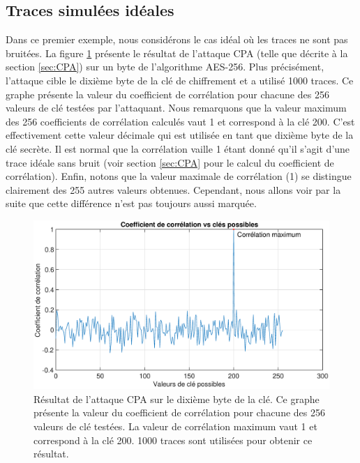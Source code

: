 \documentclass[oneside]{book}
\begin{document}
\subsection{Traces simulées idéales}
\label{sec:sim_trace}

Dans ce premier exemple, nous considérons le cas idéal où les traces ne sont pas bruitées. La figure \ref{fig:sim_10000_traces} présente le résultat de l'attaque CPA (telle que décrite à la section \ref{sec:CPA}) sur un byte de l'algorithme AES-256. Plus précisément, l'attaque cible le dixième byte de la clé de chiffrement et a utilisé 1000 traces. Ce graphe présente la valeur du coefficient de corrélation pour chacune des 256 valeurs de clé testées par l'attaquant. Nous remarquons que la valeur maximum des 256 coefficients de corrélation calculés vaut 1 et correspond à la clé 200. C'est effectivement cette valeur décimale qui est utilisée en tant que dixième byte de la clé secrète. Il est normal que la corrélation vaille 1 étant donné qu'il s'agit d'une trace idéale sans bruit (voir section \ref{sec:CPA} pour le calcul du coefficient de corrélation). Enfin, notons que la valeur maximale de corrélation (1) se distingue clairement des 255 autres valeurs obtenues. Cependant, nous allons voir par la suite que cette différence n'est pas toujours aussi marquée. 

\begin{figure}[htbp]
    \hspace{-2cm}
    \includegraphics[scale=0.4]{image/sim_10000_traces}
    \caption{Résultat de l'attaque CPA sur le dixième byte de la clé. Ce graphe présente la valeur du coefficient de corrélation pour chacune des 256 valeurs de clé testées. La valeur de corrélation maximum vaut 1 et correspond à la clé 200. 1000 traces sont utilisées pour obtenir ce résultat.}
    \label{fig:sim_10000_traces} 
\end{figure}
\end{document}
